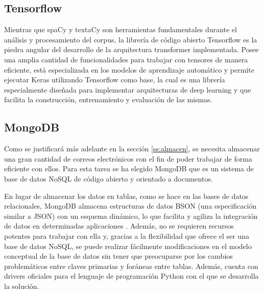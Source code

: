 \subsection{Tensorflow}\label{ss:tf}
Mientras que spaCy y textaCy son herramientas fundamentales durante el análisis y procesamiento del corpus, la librería de código abierto Tensorflow \citep{abadi2016tensorflow} es la piedra angular del desarrollo de la arquitectura transformer implementada. Posee una amplia cantidad de funcionalidades para trabajar con tensores de manera eficiente, está especializada en los modelos de aprendizaje automático y permite ejecutar Keras utilizando Tensorflow como base, la cual es una librería especialmente diseñada para implementar arquitecturas de deep learning y que facilita la construcción, entrenamiento y evaluación de las mismas.

\subsection{MongoDB}\label{ss:mongodb}
Como se justificará más adelante en la sección \ref{ss:almacen}, se necesita almacenar una gran cantidad de correos electrónicos con el fin de poder trabajar de forma eficiente con ellos. Para esta tarea se ha elegido MongoDB que es un sistema de base de datos NoSQL de código abierto y orientado a documentos.

En lugar de almacenar los datos en tablas, como se hace en las bases de datos relacionales, MongoDB almacena estructuras de datos BSON (una especificación similar a JSON) con un esquema dinámico, lo que facilita y agiliza la integración de datos en determinadas aplicaciones \citep{gyHorodi2015comparative}. Además, no se requieren recursos potentes para trabajar con ella y, gracias a la flexibilidad que ofrece el ser una base de datos NoSQL, se puede realizar fácilmente modificaciones en el modelo conceptual de la base de datos sin tener que preocuparse por los cambios problemáticos entre claves primarias y foráneas entre tablas. Además, cuenta con drivers oficiales para el lenguaje de programación Python con el que se desarrolla la solución.
